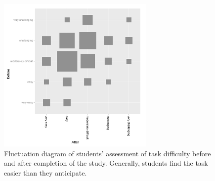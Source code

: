 \documentclass[11pt]{tise_style}
\begin{document}
\begin{figure}[htbp] %
   \centering
   \includegraphics[height=3in, keepaspectratio=true]{fb-before-after.pdf} 
   \caption{Fluctuation diagram of students' assessment of task difficulty before and after completion of  the study. Generally, students find the task easier than they anticipate.}
   \label{fb-before-and-after}
\end{figure}
\end{document}
